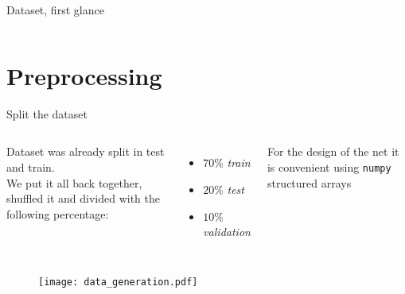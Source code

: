 \documentclass{beamer}
\begin{document}
\begin{frame}{Dataset, first glance}
\begin{columns}
    \end{columns}

\end{frame}


\section{Preprocessing}

\begin{frame}{Split the dataset}

    \begin{columns}
    
    Dataset was already split in test and train.\\
    \vspace{10 pt}
    We put it all back together, shuffled it and divided with the following percentage:
    \begin{itemize}
        \item[\textbullet] $70\%$ \textit{train}
        \item[\textbullet] $20\%$ \textit{test}
        \item[\textbullet] $10\%$ \textit{validation}
        
    \end{itemize}
    \vspace{10 pt}

    For the design of the net it is convenient using \texttt{numpy} structured arrays
    
    
    
    
    \end{columns}

    

\end{frame}

\begin{frame}
    \begin{figure}
        \centering
        \texttt{[image: data\_generation.pdf]}
    \end{figure}
\end{frame}
\end{document}
